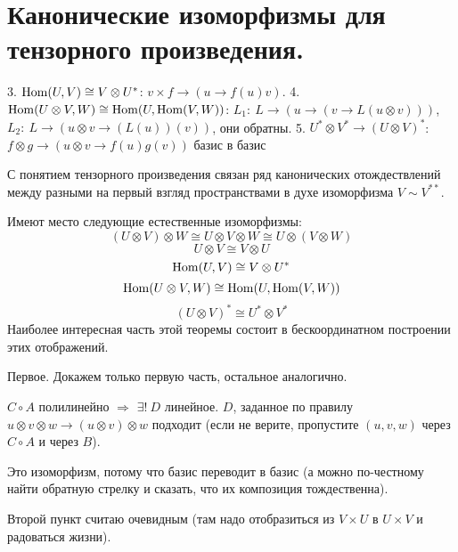 \section{
 Канонические изоморфизмы для тензорного произведения.
}

3. $\operatorname{Hom} (U,V) \cong V \otimes U^*$: $v\times f \to (u \to f(u)v)$. 4. $ \operatorname{Hom} (U\otimes V,  W) \cong \operatorname{Hom} (U, \operatorname{Hom} (V,W))$: $L_1:\ L \to (u \to (v \to L(u\otimes v)))$, $L_2:\ L \to (u\otimes v \to (L(u))(v))$, они обратны. 5. $U^{*}\otimes V^{*} \to (U \otimes V)^{*}$: $f\otimes g \to (u\otimes v \to f(u)g(v))$ базис в базис

С понятием тензорного произведения связан ряд канонических отождествлений между разными на первый взгляд пространствами в духе изоморфизма $V \sim V^{**}$.

\thrm 
	Имеют место следующие естественные изоморфизмы: 
	$$(U \otimes V) \otimes W \cong U \otimes V \otimes W \cong U \otimes (V \otimes W)$$
	$$ U \otimes V \cong V \otimes U $$
	$$ \operatorname{Hom} (U,V) \cong V \otimes U^*$$
	$$ \operatorname{Hom} (U\otimes V,  W) \cong \operatorname{Hom} (U, \operatorname{Hom} (V,W))$$
	$$(U \otimes V)^{*} \cong U^{*}\otimes V^{*}$$
	\proof 
		Наиболее интересная часть этой теоремы состоит в бескоординатном построении этих отображений. 

		Первое. Докажем только первую часть, остальное аналогично.

\begin{center}
\end{center}

		$C\circ A$ полилинейно $\Rightarrow$ $\exists!\ D$ линейное. $D$, заданное по правилу $u\otimes v\otimes w\to (u\otimes v)\otimes w$ подходит (если не верите, пропустите $(u, v, w)$ через $C\circ A$ и через $B$).

		Это изоморфизм, потому что базис переводит в базис (а можно по-честному найти обратную стрелку и сказать, что их композиция тождественна).

		Второй пункт считаю очевидным (там надо отобразиться из $V\times U$ в $U\times V$ и радоваться жизни).\\

